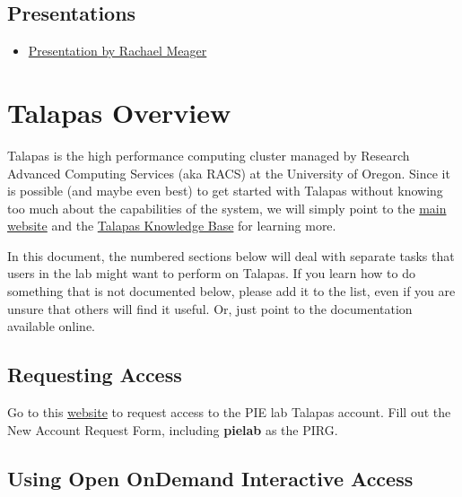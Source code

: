 \documentclass[]{book}
\providecommand{\tightlist}{%
  \setlength{\itemsep}{0pt}\setlength{\parskip}{0pt}}
\begin{document}
\hypertarget{presentations}{%
\section{Presentations}\label{presentations}}

\begin{itemize}
\tightlist
\item
  \href{https://mfr.osf.io/render?url=https\%3A\%2F\%2Fosf.io\%2Fd8wm9\%2Fdownload}{Presentation by Rachael Meager}
\end{itemize}

\hypertarget{talapas-overview}{%
\chapter{Talapas Overview}\label{talapas-overview}}

Talapas is the high performance computing cluster managed by Research Advanced Computing Services (aka RACS) at the University of Oregon. Since it is possible (and maybe even best) to get started with Talapas without knowing too much about the capabilities of the system, we will simply point to the \href{https://hpcf.uoregon.edu/content/talapas}{main website} and the \href{https://hpcrcf.atlassian.net/wiki/spaces/TCP/overview}{Talapas Knowledge Base} for learning more.

In this document, the numbered sections below will deal with separate tasks that users in the lab might want to perform on Talapas. If you learn how to do something that is not documented below, please add it to the list, even if you are unsure that others will find it useful. Or, just point to the documentation available online.

\hypertarget{requesting-access}{%
\section{Requesting Access}\label{requesting-access}}

Go to this \href{https://hpcrcf.atlassian.net/servicedesk/customer/portal/1}{website} to request access to the PIE lab Talapas account. Fill out the New Account Request Form, including \textbf{pielab} as the PIRG.

\hypertarget{using-open-ondemand-interactive-access}{%
\section{Using Open OnDemand Interactive Access}\label{using-open-ondemand-interactive-access}}
\end{document}

